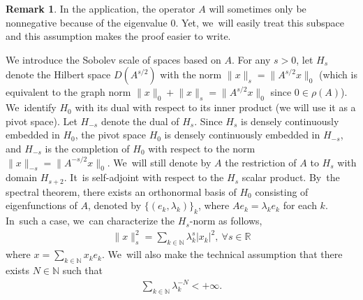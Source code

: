 \documentclass[10pt]{amsart}
\theoremstyle{definition}
\newtheorem{remark}[theorem]{Remark}
\let\ld\lambda
\newcommand{\R}{\mathbb{R}}
\newcommand{\N}{\mathbb{N}}
\providecommand{\norm}[1]{\lVert#1\rVert}
\begin{document}
\begin{remark}
In the application, the operator $A$ will sometimes only be nonnegative because of the eigenvalue $0$. Yet, we~will easily treat this subspace and this assumption makes the proof easier to write.
\end{remark}

We introduce the Sobolev scale of spaces based on $A$. For any $s>0$, let $H_s$ denote the Hilbert space $D(A^{s/2})$ with the norm $\norm{x}_s=\norm{A^{s/2}x}_{0}$ (which is equivalent to the graph norm $\norm{x}_{0}+\norm{x}_s=\norm{A^{s/2}x}_{0}$ since $0\in \rho(A)$). We~identify $H_0$ with its dual with respect to its inner product (\ie we will use it as a pivot space). Let $H_{-s}$ denote the dual of $H_s$. Since $H_s$ is densely continuously embedded in $H_0$, the pivot space $H_0$ is densely continuously embedded in $H_{-s}$, and $H_{-s}$ is the completion of $H_0$ with respect to the norm $\norm{x}_{-s}=\norm{A^{-s/2}x}_0$. We~will still denote by $A$ the restriction of $A$ to $H_s$ with domain $H_{s+2}$. It~is self-adjoint with respect to the $H_s$ scalar product. By~the spectral theorem, there exists an orthonormal basis of $H_0$ consisting of eigenfunctions of $A$, denoted by $\{(e_k, \ld_k)\}_k$, where $Ae_k=\ld_k e_k$ for each $k$. In~such a case, we~can characterize the $H_s$-norm as follows,
\begin{align*}
\norm{x}_s^2=\sum_{k\in \N} \ld_k^{s}|x_k|^2,\ \forall s\in \R
\end{align*}
where $x=\sum_{k\in \N} x_ke_k$. We~will also make the technical assumption that there exists $N\in \N$ such that
\begin{align}
\label{hypWeyl} \sum_{k\in \N}\ld_k^{-N}<+\infty.
\end{align}
\end{document}
